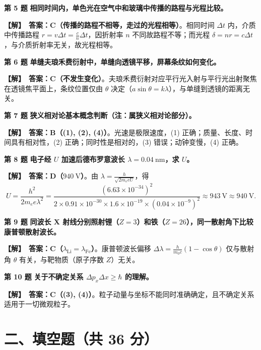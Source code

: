 \documentclass[zihao=5,a4paper,UTF8]{ctexart}
\newenvironment{prob}[2]{%
    \par\vspace{5pt}\noindent\textbf{\color{navy}#1} \textbf{#2}\par\nopagebreak\vspace{2pt}%
}{%
    \par\vspace{3pt}%
}
\newcommand{\sol}{\noindent\textbf{\color{tealaccent}【解】}\ }
\begin{document}
\begin{prob}{第 5 题}{相同时间内，单色光在空气中和玻璃中传播的路程与光程比较。}
\sol \textbf{答案：C（传播的路程不相等，走过的光程相等）}。相同时间 $\Delta t$ 内，介质中传播路程 $r = v\Delta t = \frac{c}{n}\Delta t$，因折射率 $n$ 不同故路程不等；而光程 $\delta = nr = c\Delta t$，与介质折射率无关，故光程相等。
\end{prob}

\begin{prob}{第 6 题}{单缝夫琅禾费衍射中，单缝向透镜平移，屏幕条纹如何变化。}
\sol \textbf{答案：C（不发生变化）}。夫琅禾费衍射对应平行光入射与平行光出射聚焦在透镜焦平面上，条纹位置仅由 $\theta$ 决定（$a\sin\theta = k\lambda$），与单缝到透镜的距离无关。
\end{prob}

\begin{prob}{第 7 题}{狭义相对论基本概念判断（注：属狭义相对论部分）。}
\sol \textbf{答案：B（(1), (2), (4)）}。光速是极限速度，(1) 正确；质量、长度、时间具有相对性，(2) 正确；同时性是相对的，(3) 错误；动钟变慢，(4) 正确。
\end{prob}

\begin{prob}{第 8 题}{电子经 $U$ 加速后德布罗意波长 $\lambda = 0.04\ \mathrm{nm}$，求 $U$。}
\sol \textbf{答案：D（$940\ \mathrm{V}$）}。由 $\lambda = \frac{h}{\sqrt{2m_e e U}}$，得
\[
    U = \frac{h^2}{2m_e e \lambda^2} = \frac{(6.63\times 10^{-34})^2}{2\times 0.91\times 10^{-30}\times 1.6\times 10^{-19}\times (0.04\times 10^{-9})^2} \approx 943\ \mathrm{V} \approx 940\ \mathrm{V}.
\]
\end{prob}

\begin{prob}{第 9 题}{同波长 X 射线分别照射锂（$Z=3$）和铁（$Z=26$），同一散射角下比较康普顿散射波长。}
\sol \textbf{答案：C（$\lambda_{\mathrm{Li}} = \lambda_{\mathrm{Fe}}$）}。康普顿波长偏移 $\Delta\lambda = \frac{h}{m_0 c}(1 - \cos\theta)$ 仅与散射角 $\theta$ 有关，与靶物质（原子序数 $Z$）无关。
\end{prob}

\begin{prob}{第 10 题}{关于不确定关系 $\Delta p_x \Delta x \ge \hbar$ 的理解。}
\sol \textbf{答案：C（(3), (4)）}。粒子动量与坐标不能同时准确确定，且不确定关系适用于一切微观粒子。
\end{prob}

\section*{二、填空题（共 36 分）}
\end{document}
